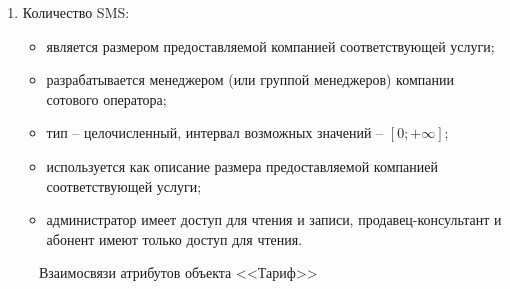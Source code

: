 \begin{enumerate}
\begin{enumerate}
        \item Количество SMS:
        \begin{itemize}
            \item является размером предоставляемой компанией соответствующей услуги;
            \item разрабатывается менеджером (или группой менеджеров) компании сотового оператора;
            \item тип -- целочисленный, интервал возможных значений -- $[0; +\infty]$; %
            \item используется как описание размера предоставляемой компанией соответствующей услуги;
            \item администратор имеет доступ для чтения и записи, продавец-консультант и абонент имеют только доступ для чтения.
        \end{itemize}
    \end{enumerate}
    \begin{figure}[H]
        \label{fig:tariff-attributes}
        \caption{Взаимосвязи атрибутов объекта <<Тариф>>}
    \end{figure}


\end{enumerate}
